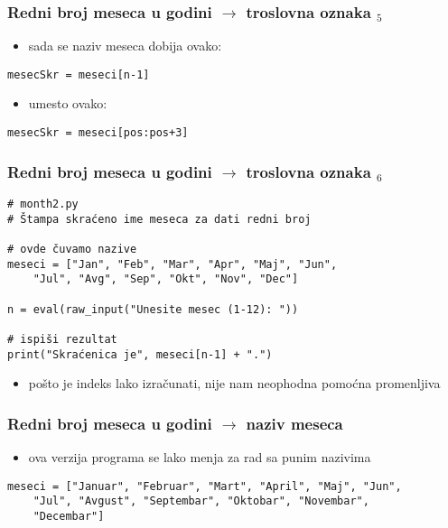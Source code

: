 \documentclass[utf8,compress]{beamer}
\begin{document}
\begin{frame}[fragile]
  \frametitle{Redni broj meseca u godini $\rightarrow$ troslovna oznaka $_5$}
  \begin{itemize}
    \item sada se naziv meseca dobija ovako:
  \end{itemize}
\begin{verbatim}
mesecSkr = meseci[n-1]
\end{verbatim}
  \begin{itemize}
    \item umesto ovako:
  \end{itemize}
\begin{verbatim}
mesecSkr = meseci[pos:pos+3]
\end{verbatim}
\end{frame}

\begin{frame}[fragile,shrink=10]
  \frametitle{Redni broj meseca u godini $\rightarrow$ troslovna oznaka $_6$}
\begin{verbatim}
# month2.py
# Štampa skraćeno ime meseca za dati redni broj

# ovde čuvamo nazive
meseci = ["Jan", "Feb", "Mar", "Apr", "Maj", "Jun", 
    "Jul", "Avg", "Sep", "Okt", "Nov", "Dec"]

n = eval(raw_input("Unesite mesec (1-12): "))

# ispiši rezultat
print("Skraćenica je", meseci[n-1] + ".")
\end{verbatim}
  \begin{itemize}
    \item pošto je indeks lako izračunati, nije nam neophodna pomoćna promenljiva
  \end{itemize}
\end{frame}

\begin{frame}[fragile,shrink=10]
  \frametitle{Redni broj meseca u godini $\rightarrow$ naziv meseca}
  \begin{itemize}
    \item ova verzija programa se lako menja za rad sa punim nazivima
  \end{itemize}
\begin{verbatim}
meseci = ["Januar", "Februar", "Mart", "April", "Maj", "Jun", 
    "Jul", "Avgust", "Septembar", "Oktobar", "Novembar", 
    "Decembar"]
\end{verbatim}
\end{frame}
\end{document}
